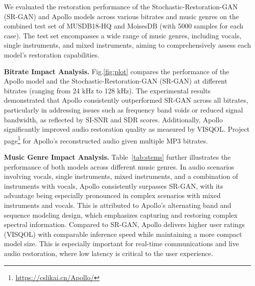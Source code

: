 We evaluated the restoration performance of the Stochastic-Restoration-GAN (SR-GAN) \cite{lattner2021stochastic} and Apollo models across various bitrates and music genres on the combined test set of MUSDB18-HQ and MoisesDB (with 5000 samples for each case). The test set encompasses a wide range of music genres, including vocals, single instruments, and mixed instruments, aiming to comprehensively assess each model's restoration capabilities.

\textbf{Bitrate Impact Analysis.} Fig.\ref{fig:plot} compares the performance of the Apollo model and the Stochastic-Restoration-GAN (SR-GAN) at different bitrates (ranging from 24 kHz to 128 kHz). The experimental results demonstrated that Apollo consistently outperformed SR-GAN across all bitrates, particularly in addressing issues such as frequency band voids or reduced signal bandwidth, as reflected by SI-SNR and SDR scores. Additionally, Apollo significantly improved audio restoration quality as measured by VISQOL. Project page\footnote{\url{https://cslikai.cn/Apollo/}} for Apollo's reconstructed audio given multiple MP3 bitrates.

\textbf{Music Genre Impact Analysis.} Table~\ref{tab:stems} further illustrates the performance of both models across different music genres. In audio scenarios involving vocals, single instruments, mixed instruments, and a combination of instruments with vocals, Apollo consistently surpasses SR-GAN, with its advantage being especially pronounced in complex scenarios with mixed instruments and vocals. This is attributed to Apollo's alternating band and sequence modeling design, which emphasizes capturing and restoring complex spectral information. Compared to SR-GAN, Apollo delivers higher user ratings (VISQOL) with comparable inference speed while maintaining a more compact model size. This is especially important for real-time communications and live audio restoration, where low latency is critical to the user experience.

